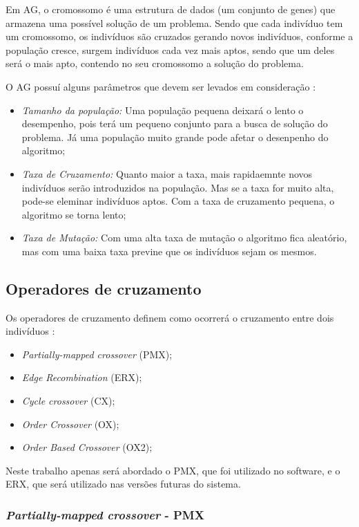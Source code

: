 \documentclass{abnt}
\begin{document}
		Em AG, o cromossomo é uma estrutura de dados (um conjunto de genes) que armazena uma possível solução de um problema. Sendo que cada indivíduo tem um cromossomo, os indivíduos são cruzados gerando novos indivíduos, conforme a população cresce, surgem indivíduos cada vez mais aptos, sendo que um deles será o mais apto, contendo no seu cromossomo a solução do problema.

		O AG possuí alguns parâmetros que devem ser levados em consideração \cite{0001-pdf}:

		\begin{itemize}
			\item \textit{Tamanho da população: } Uma população pequena deixará o lento o desempenho, pois terá um pequeno conjunto para a busca de solução do problema. Já uma população muito grande pode afetar o desenpenho do algoritmo;
			\item \textit{Taxa de Cruzamento: } Quanto maior a taxa, mais rapidaemnte novos indivíduos serão introduzidos na população. Mas se a taxa for muito alta, pode-se eleminar indivíduos aptos. Com a taxa de cruzamento pequena, o algoritmo se torna lento;
			\item \textit{Taxa de Mutação: } Com uma alta taxa de mutação o algoritmo fica aleatório, mas com uma baixa taxa previne que os indivíduos sejam os mesmos.
		\end{itemize}


		\subsection{Operadores de cruzamento}

			Os operadores de cruzamento definem como ocorrerá o cruzamento entre dois indivíduos \cite{0012-pdf}:
			\begin{itemize}
				\item \textit{Partially-mapped crossover} (PMX);
				\item \textit{Edge Recombination} (ERX);
				\item \textit{Cycle crossover} (CX);
				\item \textit{Order Crossover} (OX);
				\item \textit{Order Based Crossover} (OX2);
			\end{itemize}

			Neste trabalho apenas será abordado o PMX, que foi utilizado no software, e o ERX, que será utilizado nas versões futuras do sistema.

		\subsubsection{\textit{Partially-mapped crossover} - PMX} 
\end{document}
